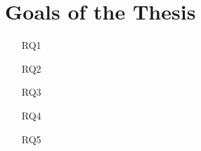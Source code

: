\section{Goals of the Thesis}

\lipsum[1-1]

\begin{itemize}
    \item[RQ1] \lipsum[1-1]
    \item[RQ2] \lipsum[2-2]
    \item[RQ3] \lipsum[3-3]
    \item[RQ4] \lipsum[4-4]
    \item[RQ5] \lipsum[5-5]
\end{itemize}

\lipsum[6-7]